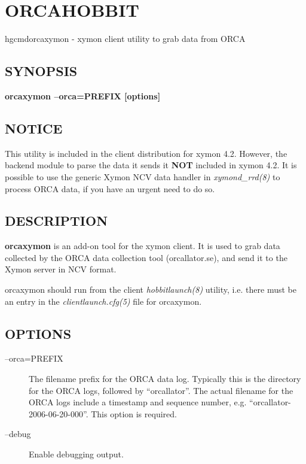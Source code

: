  
  

%


\newpage
\section{ORCAHOBBIT}

hgcmd{orcaxymon} - xymon client utility to grab data from ORCA

 \subsection{SYNOPSIS}
\textbf{orcaxymon --orca=PREFIX [options]}


 
\subsection{NOTICE}
 This utility is included in the client distribution for xymon 4.2. However, the backend module to parse the data it sends it \textbf{NOT}
 included in xymon 4.2. It is possible to use the generic Xymon NCV data handler in \emph{xymond\_rrd(8)}
 to process ORCA data, if you have an urgent need to do so. 

 
\subsection{DESCRIPTION}
\textbf{orcaxymon}
 is an add-on tool for the xymon client. It is used to grab data collected by the ORCA data collection tool (orcallator.se), and send it to the Xymon server in NCV format. 

  orcaxymon should run from the client \emph{hobbitlaunch(8)}
 utility, i.e. there must be an entry in the \emph{clientlaunch.cfg(5)}
 file for orcaxymon. 


 
\subsection{OPTIONS}
\begin{description}
\item[--orca=PREFIX] The filename prefix for the ORCA data log. Typically this is the directory for the ORCA logs, followed by ``orcallator''. The actual filename for the ORCA logs include a timestamp and sequence number, e.g. ``orcallator-2006-06-20-000''. This option is required. 

 

\item[--debug] Enable debugging output. 

 


\end{description}
